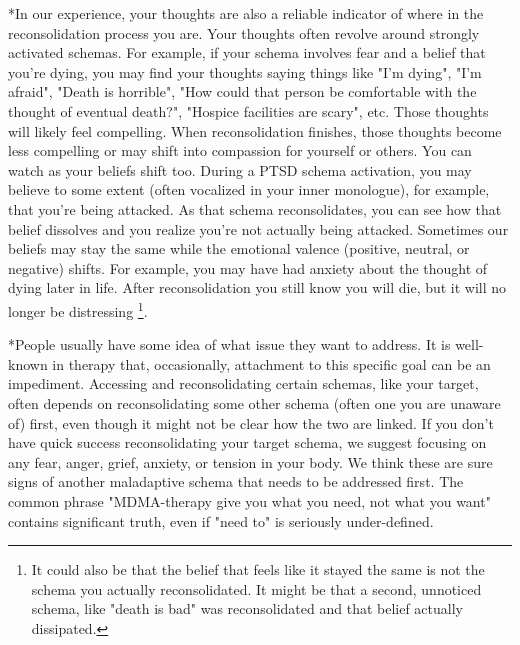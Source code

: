 \documentclass[12pt,letterpaper]{book}
\begin{document}
*In our experience, your thoughts are also a reliable indicator of where in the reconsolidation process you are. Your thoughts often revolve around strongly activated schemas. For example, if your schema involves fear and a belief that you're dying, you may find your thoughts saying things like "I'm dying", "I'm afraid", "Death is horrible", "How could that person be comfortable with the thought of eventual death?", "Hospice facilities are scary", etc. Those thoughts will likely feel compelling. When reconsolidation finishes, those thoughts become less compelling or may shift into compassion for yourself or others. You can watch as your beliefs shift too. During a PTSD schema activation, you may believe to some extent (often vocalized in your inner monologue), for example, that you're being attacked. As that schema reconsolidates, you can see how that belief dissolves and you realize you're not actually being attacked. Sometimes our beliefs may stay the same while the emotional valence (positive, neutral, or negative) shifts. For example, you may have had anxiety about the thought of dying later in life. After reconsolidation you still know you will die, but it will no longer be distressing \footnote{It could also be that the belief that feels like it stayed the same is not the schema you actually reconsolidated. It might be that a second, unnoticed schema, like "death is bad" was reconsolidated and that belief actually dissipated.}.

*People usually have some idea of what issue they want to address. It is well-known in therapy that, occasionally, attachment to this specific goal can be an impediment. Accessing and reconsolidating certain schemas, like your target, often depends on reconsolidating some other schema (often one you are unaware of) first, even though it might not be clear how the two are linked. If you don't have quick success reconsolidating your target schema, we suggest focusing on any fear, anger, grief, anxiety, or tension in your body. We think these are sure signs of another maladaptive schema that needs to be addressed first. The common phrase "MDMA-therapy give you what you need, not what you want" contains significant truth, even if "need to" is seriously under-defined.
\end{document}
